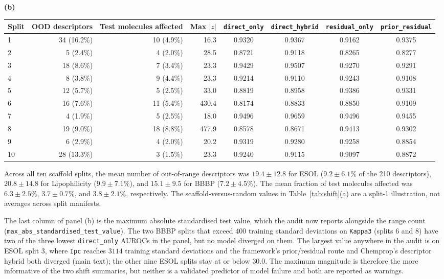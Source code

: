 \documentclass[10pt,a4paper]{article}
\newcommand{\cfg}[1]{\texttt{#1}}
\begin{document}
\begin{table}[H]
\medskip\textbf{(b)}\par\smallskip
\begingroup\setlength{\tabcolsep}{4pt}
\begin{tabular}{@{}lrrrcccc@{}}
\toprule
Split & OOD descriptors & Test molecules affected & Max $|z|$ & \cfg{direct\_only} & \cfg{direct\_hybrid} & \cfg{residual\_only} & \cfg{prior\_residual} \\
\midrule
1 & 34 (16.2\%) & 10 (4.9\%) & 16.3 & 0.9320 & 0.9367 & 0.9162 & 0.9375 \\
2 & 5 (2.4\%) & 4 (2.0\%) & 28.5 & 0.8721 & 0.9118 & 0.8265 & 0.8277 \\
3 & 18 (8.6\%) & 7 (3.4\%) & 23.3 & 0.9429 & 0.9507 & 0.9270 & 0.9291 \\
4 & 8 (3.8\%) & 9 (4.4\%) & 23.3 & 0.9214 & 0.9110 & 0.9243 & 0.9108 \\
5 & 12 (5.7\%) & 5 (2.5\%) & 33.0 & 0.8819 & 0.8958 & 0.9386 & 0.9331 \\
6 & 16 (7.6\%) & 11 (5.4\%) & 430.4 & 0.8174 & 0.8833 & 0.8850 & 0.9109 \\
7 & 4 (1.9\%) & 5 (2.5\%) & 18.0 & 0.9496 & 0.9659 & 0.9496 & 0.9455 \\
8 & 19 (9.0\%) & 18 (8.8\%) & 477.9 & 0.8578 & 0.8671 & 0.9413 & 0.9302 \\
9 & 6 (2.9\%) & 4 (2.0\%) & 20.2 & 0.9319 & 0.9280 & 0.9258 & 0.8854 \\
10 & 28 (13.3\%) & 3 (1.5\%) & 23.3 & 0.9240 & 0.9115 & 0.9097 & 0.8872 \\
\bottomrule
\end{tabular}
\endgroup
\end{table}

Across all ten scaffold splits, the mean number of out-of-range descriptors was $19.4\pm12.8$ for ESOL ($9.2\pm6.1\%$ of the 210 descriptors), $20.8\pm14.8$ for Lipophilicity ($9.9\pm7.1\%$), and $15.1\pm9.5$ for BBBP ($7.2\pm4.5\%$). The mean fraction of test molecules affected was $6.3\pm2.5\%$, $3.7\pm0.7\%$, and $3.8\pm2.1\%$, respectively. The scaffold-versus-random values in Table~\ref{tab:shift}(a) are a split-1 illustration, not averages across split manifests.

The last column of panel (b) is the maximum absolute standardised test value, which the audit now reports alongside the range count (\cfg{max\_abs\_standardised\_test\_value}). The two BBBP splits that exceed 400 training standard deviations on \cfg{Kappa3} (splits 6 and 8) have two of the three lowest \cfg{direct\_only} AUROCs in the panel, but no model diverged on them. The largest value anywhere in the audit is on ESOL split 3, where \cfg{Ipc} reaches $3114$ training standard deviations and the framework's prior/residual route and Chemprop's descriptor hybrid both diverged (main text); the other nine ESOL splits stay at or below $30.0$. The maximum magnitude is therefore the more informative of the two shift summaries, but neither is a validated predictor of model failure and both are reported as warnings.
\end{document}
